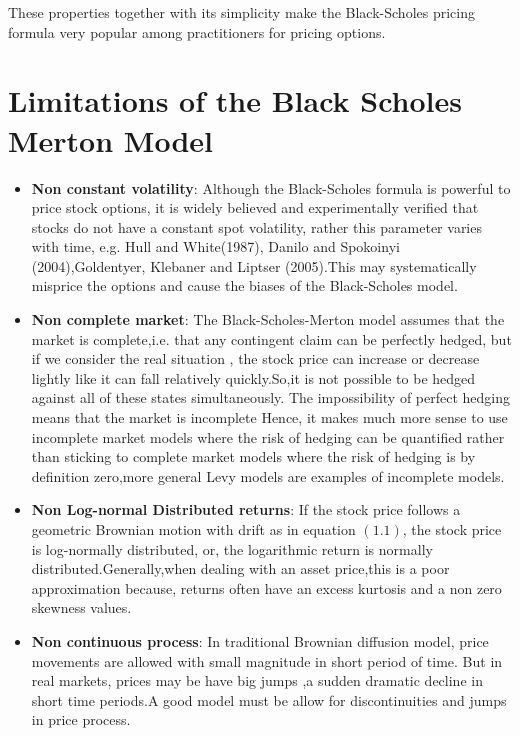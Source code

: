 \documentclass[12pt]{report}
\begin{document}
These properties together with its simplicity make the Black-Scholes pricing formula very popular among practitioners for pricing options. 
\section{ Limitations of the Black Scholes Merton Model }
\begin{itemize}
\item \textbf{Non constant volatility}:
Although the Black-Scholes formula is powerful to price stock options, it is widely believed and experimentally verified  that stocks do not have a constant spot volatility, rather this parameter varies with time, e.g. Hull and White(1987), Danilo and Spokoinyi (2004),Goldentyer, Klebaner and Liptser (2005).This may systematically misprice the options and cause the biases of the Black-Scholes model. 


\item \textbf{Non complete market}:
The Black-Scholes-Merton  model assumes that the market is complete,i.e.  that any contingent claim can be perfectly hedged, but if we consider the real situation , the stock price can increase or decrease
lightly like it can fall relatively quickly.So,it is not possible to be hedged against all of these states
simultaneously. The impossibility of perfect hedging means that the market is incomplete Hence, it makes much more sense to use incomplete market models where the risk of hedging can be quantified rather than sticking to complete market models where the risk of hedging is by definition zero,more general Levy models  are examples of incomplete models. 


\item \textbf{Non Log-normal Distributed returns}: If the stock price follows a geometric Brownian motion with drift  as in equation $(1.1)$, the stock price is log-normally distributed, or, the logarithmic return is normally
distributed.Generally,when dealing with an asset price,this is a poor approximation because, returns often have an excess kurtosis and a non zero skewness values.

\item \textbf{Non continuous process}:
In traditional Brownian diffusion model, price movements are allowed with  small magnitude in short period of time. But in real markets, prices may be have big jumps ,a sudden dramatic decline in short time periods.A good model must be allow for discontinuities and jumps in price process.

\end{itemize}
\end{document}
